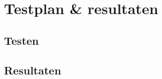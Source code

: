 \chapter{Testplan \& resultaten}
    \label{chap:testplan_en_resultaten}
\section{Testen}
    \label{sec:testen}
\section{Resultaten}
    \label{sec:resultaten}

\clearpage